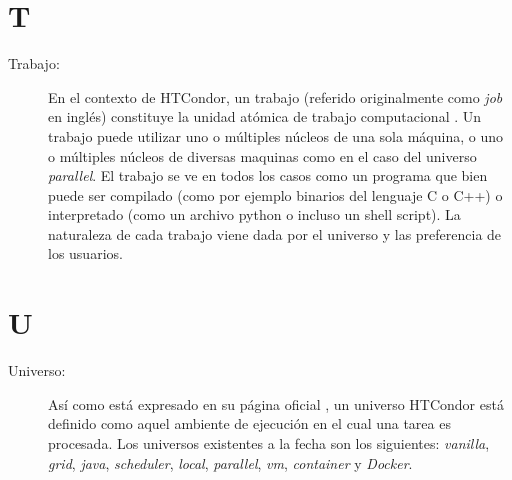 \section*{T}
\begin{description}
	\item [Trabajo:] En el contexto de HTCondor, un trabajo (referido originalmente como \textit{job} en inglés) constituye la unidad atómica de trabajo computacional \citep{HTCondor-what-is-a-job}. Un trabajo puede utilizar uno o múltiples núcleos de una sola máquina, o uno o múltiples núcleos de diversas maquinas como en el caso del universo \textit{parallel}. El trabajo se ve en todos los casos como un programa que bien puede ser compilado (como por ejemplo binarios del lenguaje C o C++) o interpretado (como un archivo python o incluso un shell script). La naturaleza de cada trabajo viene dada por el universo y las preferencia de los usuarios.
\end{description}


\section*{U}
\begin{description}
	\item[Universo:] Así como está expresado en su página oficial \citep{HTCondor}, un universo HTCondor está definido como aquel ambiente de ejecución en el cual una tarea es procesada. Los universos existentes a la fecha son los siguientes: \textit{vanilla}, \textit{grid}, \textit{java}, \textit{scheduler}, \textit{local}, \textit{parallel}, \textit{vm}, \textit{container} y \textit{Docker}.
\end{description}
